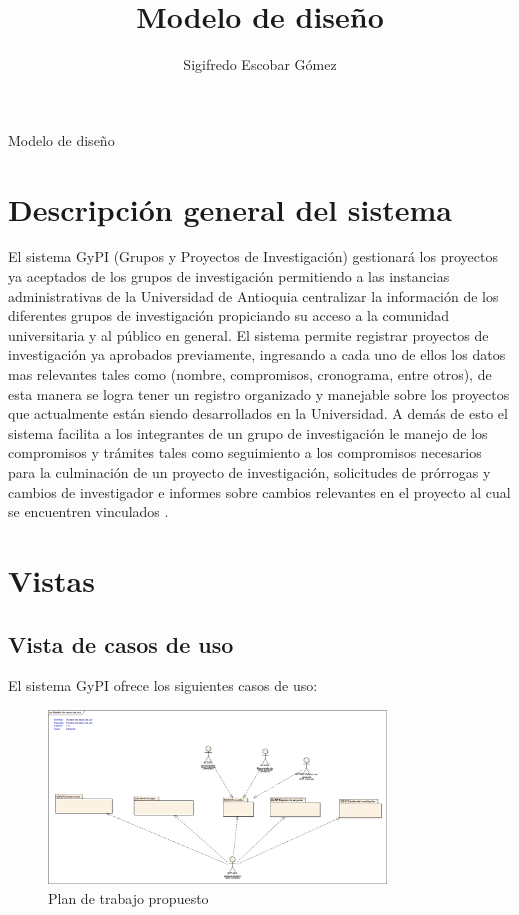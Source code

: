 \documentclass[12pt,oneside,letterpaper]{report}
\title{Modelo de diseño}
\author{Sigifredo Escobar Gómez}
\date{}
\begin{document}
\maketitle Modelo de diseño

\tableofcontents	%

\newpage

\chapter{Descripción general del sistema}
\maketitle El sistema GyPI (Grupos y Proyectos de Investigación) gestionará los proyectos ya aceptados de los grupos de investigación permitiendo a las instancias administrativas de la Universidad de Antioquia centralizar la información de los diferentes grupos de investigación propiciando su acceso a la comunidad universitaria y al público en general.
El sistema permite registrar proyectos de investigación ya aprobados previamente, ingresando a cada uno de ellos los datos mas relevantes tales como (nombre, compromisos, cronograma, entre otros), de esta manera se logra tener un registro organizado y manejable sobre los proyectos que actualmente están siendo desarrollados en la Universidad. A demás de esto el sistema facilita a los  integrantes de un grupo de investigación le manejo de los compromisos y trámites tales como seguimiento a los compromisos necesarios para la culminación de un proyecto de investigación, solicitudes de prórrogas y cambios de investigador e informes sobre cambios relevantes en el proyecto al cual se encuentren vinculados .

\newpage

\chapter{Vistas}
\section{Vista de casos de uso}
\maketitle El sistema GyPI  ofrece los siguientes casos de uso:

\begin{figure}[h!]
  \centering
    \includegraphics[width=0.80\textwidth]{./img/img1.bmp}
  \caption{Plan de trabajo propuesto}
\end{figure}
\end{document}
